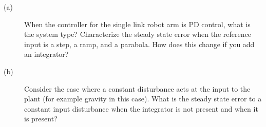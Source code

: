 
\begin{description}
\item[]
\item[(a)] When the controller for the single link robot arm is PD control, what is the system type?  Characterize the steady state error when the reference input is a step, a ramp, and a parabola.  How does this change if you add an integrator?
\item[(b)] Consider the case where a constant disturbance acts at the input to the plant (for example gravity in this case).  What is the steady state error to a constant input disturbance when the integrator is not present and when it is present?
\end{description}
